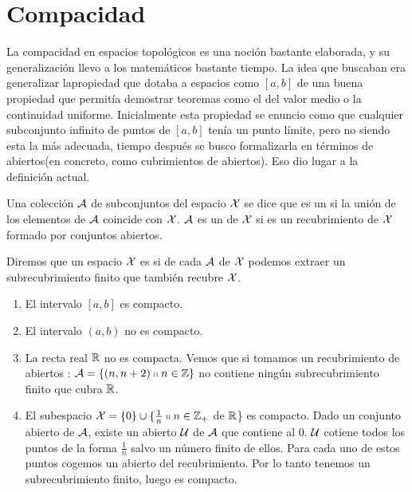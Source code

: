 \chapter{Compacidad}
\label{comp}
La compacidad en espacios topológicos es una noción bastante elaborada, y su generalización llevo a los matemáticos bastante tiempo. La idea que buscaban era generalizar lapropiedad que dotaba a espacios como $[a,b]$ de una buena propiedad que permitía demostrar teoremas como el del valor medio o la continuidad uniforme. Inicialmente esta propiedad se enuncio como que cualquier subconjunto infinito de puntos de $[a,b]$ tenía un punto límite, pero no siendo esta la más adecuada, tiempo después se busco formalizarla en términos de abiertos(en concreto, como cubrimientos de abiertos). Eso dio lugar a la definición actual.
\begin{defi}
	Una colección $\mathcal{A}$ de subconjuntos del espacio $\mathcal{X}$ se dice que es un  si la unión de los elementos de $\mathcal{A}$ coincide con $\mathcal{X}$. $\mathcal{A}$ es un  de $\mathcal{X}$ si es un recubrimiento de $\mathcal{X}$ formado por conjuntos abiertos.
\end{defi}

\begin{defi}[Compacto]
	Diremos que un espacio $\mathcal{X}$ es  si de cada  $\mathcal{A}$ de $\mathcal{X}$ podemos extraer un subrecubrimiento finito que también recubre $\mathcal{X}$.
\end{defi}

\begin{exa}
	\begin{enumerate}
		\item El intervalo $[a,b]$ es compacto.
		\item El intervalo $(a,b)$ no es compacto.
		\item La recta real $\mathbb{R}$ no es compacta. Vemos que si tomamos un recubrimiento de abiertos : $\mathcal{A}=\{(n,n+2) \shortparallel n \in \mathbb{Z}\}$ no contiene ningún subrecubrimiento finito que cubra $\mathbb{R}$.
		\item El subespacio $\mathcal{X} = \{0\} \cup \{\frac{1}{n} \shortparallel n \in \mathbb{Z}_{+}$ de $\mathbb{R}$\} es compacto.
		Dado un conjunto abierto de $\mathcal{A}$, existe un abierto $\mathcal{U}$ de $\mathcal{A}$ que contiene al $0$. $\mathcal{U}$ cotiene todos los puntos de la forma $\frac{1}{n}$ salvo un número finito de ellos. Para cada uno de estos puntos cogemos un abierto del recubrimiento. Por lo tanto tenemos un subrecubrimiento finito, luego es compacto. 
	\end{enumerate}
\end{exa}